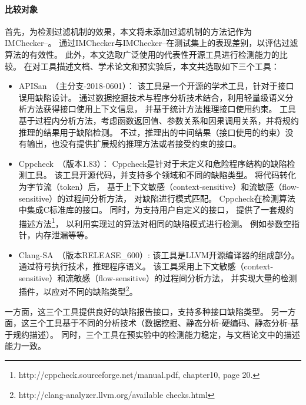 \paragraph{ 比较对象}
首先，为检测过滤机制的效果，本文将未添加过滤机制的方法记作为IMChecker--。
通过IMChecker与IMChecker--在测试集上的表现差别，以评估过滤算法的有效性。
此外，本文选取广泛使用的代表性开源工具进行检测能力的比较。
在对工具描述文档、学术论文和预实验后，本文共选取如下三个工具：
\begin{itemize}
	\item APISan~\cite{16-sec-apisan}（主分支-2018-0601）：
	该工具是一个开源的学术工具，针对于接口误用缺陷设计。
	通过数据挖掘技术与程序分析技术结合，利用轻量级语义分析方法获得接口使用上下文信息，
	并基于统计方法推理接口使用约束。
	工具基于过程内分析方法，考虑函数返回值、参数关系和因果调用关系，并将规约推理的结果用于缺陷检测。
	不过，推理出的中间结果（接口使用的约束）没有输出，也没有提供扩展规约推理方法或者接受约束的接口。
	\item Cppcheck~\cite{cppcheck}（版本1.83）：
	Cppcheck是针对于未定义和危险程序结构的缺陷检测工具。
	该工具开源代码，并支持多个领域和不同的缺陷类型。
	将代码转化为字节流（token）后，
	基于上下文敏感（context-sensitive）和流敏感（flow-sensitive）的过程间分析方法，
	对缺陷进行模式匹配。
	Cppcheck在检测算法中集成C标准库的接口。
	同时，为支持用户自定义的接口，
	提供了一套规约描述方法\footnote{http://cppcheck.sourceforge.net/manual.pdf, chapter10, page 20.}，
	以利用实现过的算法对相同的缺陷模式进行检测。
	例如参数空指针，内存泄漏等等。
	\item Clang-SA~\cite{clang-sa}（版本RELEASE\_600）:
	该工具是LLVM开源编译器的组成部分。
	通过符号执行技术，推理程序语义。
	该工具采用上下文敏感（context-sensitive）和流敏感（flow-sensitive）的过程间分析方法，
	并实现大量的检测插件，以应对不同的缺陷类型\footnote{http://clang-analyzer.llvm.org/available checks.html}。
\end{itemize} 
一方面，这三个工具提供良好的缺陷报告接口，支持多种接口缺陷类型。
另一方面，这三个工具基于不同的分析技术（数据挖掘、静态分析-硬编码、静态分析-基于规约描述）。
同时，三个工具在预实验中的检测能力稳定，与文档论文中的描述能力一致。

